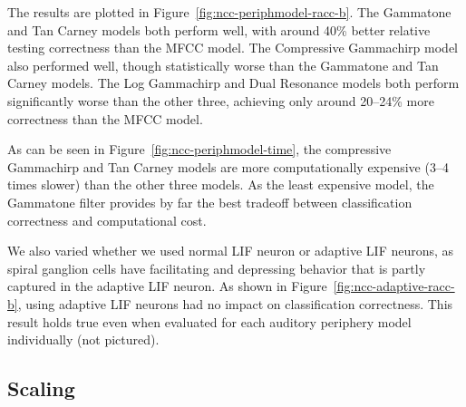 
The results are plotted
in Figure~\ref{fig:ncc-periphmodel-racc-b}.
The Gammatone and Tan Carney models
both perform well,
with around 40\% better relative testing correctness
than the MFCC model.
The Compressive Gammachirp model
also performed well,
though statistically worse
than the Gammatone and Tan Carney models.
The Log Gammachirp and Dual Resonance models
both perform significantly worse
than the other three,
achieving only around 20--24\%
more correctness than the MFCC model.


As can be seen in Figure~\ref{fig:ncc-periphmodel-time},
the compressive Gammachirp
and Tan Carney models are
more computationally expensive
(3--4 times slower)
than the other three models.
As the least expensive model,
the Gammatone filter
provides by far the best tradeoff
between classification correctness
and computational cost.


We also varied whether we used
normal LIF neuron or adaptive LIF neurons,
as spiral ganglion cells
have facilitating and depressing behavior
that is partly captured in the adaptive LIF neuron.
As shown in Figure~\ref{fig:ncc-adaptive-racc-b},
using adaptive LIF neurons had no impact
on classification correctness.
This result holds true even when
evaluated for each auditory periphery model
individually (not pictured).

\subsection{Scaling}

